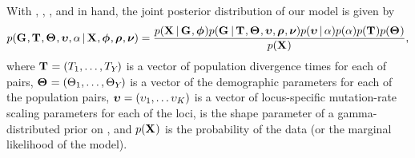 \documentclass[letterpaper,12pt]{article}
\begin{document}
\begin{linenumbers}
\begin{linenomath}
With \alignmentVector, \hkyModelVector, \ploidyScalarVector, and
\mutationRateScalarConstantVector in hand, the joint posterior distribution
of our model is given by
\begin{equation}
    p(\geneTreeVector, \divTimeMapVector, \demographicParamVector, 
    \locusMutationRateScalarVector, \locusRateHetShapeParameter \given
    \alignmentVector, \hkyModelVector, \ploidyScalarVector,
    \mutationRateScalarConstantVector) =
    \frac{p(\alignmentVector \given \geneTreeVector, \hkyModelVector)
        p(\geneTreeVector \given \divTimeMapVector, \demographicParamVector,
        \locusMutationRateScalarVector, \ploidyScalarVector,
        \mutationRateScalarConstantVector)
        p(\locusMutationRateScalarVector \given \locusRateHetShapeParameter)
        p(\locusRateHetShapeParameter)
        p(\divTimeMapVector)
        p(\demographicParamVector)}{
        p(\alignmentVector)},
    \label{eq:fullModelCompact}
\end{equation}
where
$\mathbf{T_{}} = (T_{1}, \ldots, T_{Y_{}})$
is a vector of population divergence times for each of \npairs{} pairs,
$\mathbf{\Theta_{}} = (\Theta_{1}, \ldots,
\Theta_{Y_{}})$
is a vector of the demographic parameters for each of the \npairs{} population
pairs,
$\boldsymbol{\upsilon} = (\upsilon_{1}, \ldots
\upsilon_{K})$
is a vector of locus-specific mutation-rate scaling parameters for each of the
\nlociTotal loci,
\locusRateHetShapeParameter is the shape parameter of a gamma-distributed
prior on \locusMutationRateScalar{}, and
$p(\alignmentVector)$ is the probability of the data (or the marginal
likelihood of the model).
\end{linenomath}


\end{linenumbers}
\end{document}
